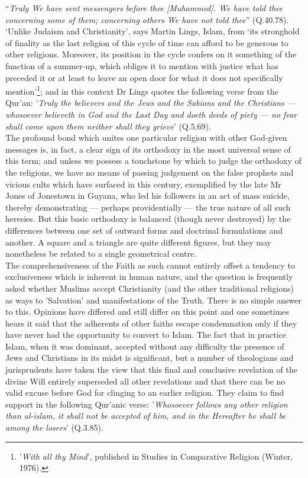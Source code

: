 \documentclass[10pt, twoside]{book}
\begin{document}
``\emph{Truly We have sent messengers before thee [Muhammed]. We have told thee concerning some of them; concerning others We have not told thee}'' (Q.40.78). `Unlike Judaism and Christianity', says Martin Lings, Islam, from `its stronghold of finality as the last religion of this cycle of time can afford 
to be generous to other religions. Moreover, its position in the cycle confers on it something of the 
function of a summer\hyp{}up, which obliges it to mention with justice what has preceded it or at least to 
leave an open door for what it does not specifically mention'\footnote{'\emph{With all thy Mind}', published in Studies in Comparative Religion (Winter, 1976).}; and in this context Dr Lings quotes 
the following verse from the Qur'an: '\emph{Truly the believers and the Jews and the Sabians and the 
Christians --- whosoever believeth in God and the Last Day and doeth deeds of piety --- no fear shall 
come upon them neither shall they grieve}' (Q.5.69). \\



The profound bond which unites one particular religion with other God\hyp{}given messages is, in fact, a 
clear sign of its orthodoxy in the most universal sense of this term; and unless we possess a 
touchstone by which to judge the orthodoxy of the religions, we have no means of passing judgement on 
the false prophets and vicious cults which have surfaced in this century, exemplified by the late Mr 
Jones of Jonestown in Guyana, who led his followers in an act of mass suicide, thereby demonstrating 
--- perhaps providentially --- the true nature of all such heresies. But this basic orthodoxy is balanced 
(though never destroyed) by the differences between one set of outward forms and doctrinal 
formulations and another. A square and a triangle are quite different figures, but they may 
nonetheless be related to a single geometrical centre. \\

The comprehensiveness of the Faith as such cannot entirely offset a tendency to exclusiveness which 
is inherent in human nature, and the question is frequently asked whether Muslims accept Christianity 
(and the other traditional religions) as ways to 'Salvation' and manifestations of the Truth. There 
is no simple answer to this. Opinions have differed and still differ on this point and one sometimes 
hears it said that the adherents of other faiths escape condemnation only if they have never had the 
opportunity to convert to Islam. The fact that in practice Islam, when it was dominant, accepted 
without any difficulty the presence of Jews and Christians in its midst is significant, but a number 
of theologians and jurisprudents have taken the view that this final and conclusive revelation of the 
divine Will entirely superseded all other revelations and that there can be no valid excuse before 
God for clinging to an earlier religion. They claim to find support in the following Qur'anic verse: 
'\emph{Whosoever follows any other religion than al\hyp{}islam, it shall not be accepted of him, and in the 
Hereafter he shall be among the losers}' (Q.3.85). \\
\end{document}
